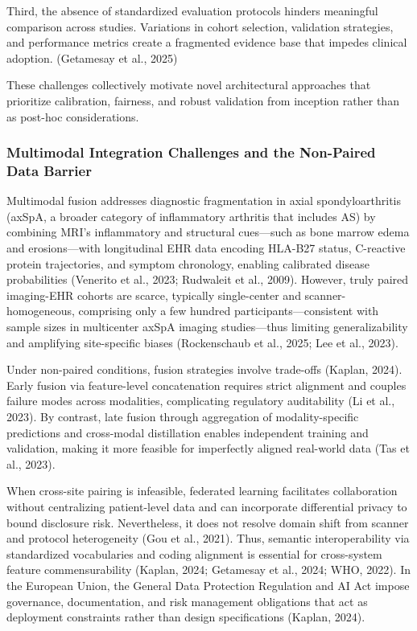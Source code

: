 \documentclass[12pt, a4paper]{article}
\begin{document}
Third, the absence of standardized evaluation protocols hinders meaningful comparison across studies. Variations in cohort selection, validation strategies, and performance metrics create a fragmented evidence base that impedes clinical adoption. (Getamesay et al., 2025)

These challenges collectively motivate novel architectural approaches that prioritize calibration, fairness, and robust validation from inception rather than as post-hoc considerations.

\subsubsection{Multimodal Integration Challenges and the Non-Paired Data Barrier}
Multimodal fusion addresses diagnostic fragmentation in axial spondyloarthritis (axSpA, a broader category of inflammatory arthritis that includes AS) by combining MRI's inflammatory and structural cues—such as bone marrow edema and erosions—with longitudinal EHR data encoding HLA-B27 status, C-reactive protein trajectories, and symptom chronology, enabling calibrated disease probabilities (Venerito et al., 2023; Rudwaleit et al., 2009). However, truly paired imaging-EHR cohorts are scarce, typically single-center and scanner-homogeneous, comprising only a few hundred participants—consistent with sample sizes in multicenter axSpA imaging studies—thus limiting generalizability and amplifying site-specific biases (Rockenschaub et al., 2025; Lee et al., 2023).

Under non-paired conditions, fusion strategies involve trade-offs (Kaplan, 2024). Early fusion via feature-level concatenation requires strict alignment and couples failure modes across modalities, complicating regulatory auditability (Li et al., 2023). By contrast, late fusion through aggregation of modality-specific predictions and cross-modal distillation enables independent training and validation, making it more feasible for imperfectly aligned real-world data (Tas et al., 2023).

When cross-site pairing is infeasible, federated learning facilitates collaboration without centralizing patient-level data and can incorporate differential privacy to bound disclosure risk. Nevertheless, it does not resolve domain shift from scanner and protocol heterogeneity (Gou et al., 2021). Thus, semantic interoperability via standardized vocabularies and coding alignment is essential for cross-system feature commensurability (Kaplan, 2024; Getamesay et al., 2024; WHO, 2022). In the European Union, the General Data Protection Regulation and AI Act impose governance, documentation, and risk management obligations that act as deployment constraints rather than design specifications (Kaplan, 2024).
\end{document}

